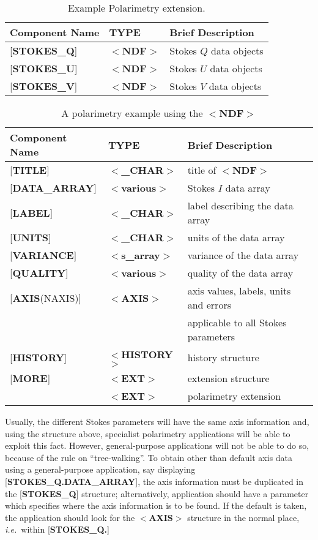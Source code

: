 \begin{table}[htb]
\centering
\caption{Example Polarimetry extension.}
\begin{tabular}{|l|l|l|}
\hline
Component Name & TYPE & Brief Description \\ \hline
{[}{\bf STOKES\_Q}{]} & $<${\bf NDF}$>$ & Stokes $Q$ data objects \\
{[}{\bf STOKES\_U}{]} & $<${\bf NDF}$>$ & Stokes $U$ data objects \\
{[}{\bf STOKES\_V}{]} & $<${\bf NDF}$>$ & Stokes $V$ data objects \\ \hline
\end{tabular}
\end{table}

\begin{table}[htb]
\centering
\caption{A polarimetry example using the $<${\bf NDF}$>$}
\begin{tabular}{|l|l|l|}
\hline
Component Name & TYPE & Brief Description \\ \hline
{[}{\bf TITLE}{]} & $<${\bf \_CHAR}$>$ & title of $<${\bf NDF}$>$ \\
{[}{\bf DATA\_ARRAY}{]} & $<${\bf various}$>$ & Stokes $I$ data array \\
{[}{\bf LABEL}{]} & $<${\bf \_CHAR}$>$ & label describing the data array \\
{[}{\bf UNITS}{]} & $<${\bf \_CHAR}$>$ & units of the data array \\
{[}{\bf VARIANCE}{]} & $<${\bf s\_array}$>$ & variance of the data array \\
{[}{\bf QUALITY}{]} & $<${\bf various}$>$ & quality of the data array \\
{[}{\bf AXIS}(NAXIS){]} & $<${\bf AXIS}$>$ & axis values, labels, units and errors\\
& & applicable to all Stokes parameters \\
{[}{\bf HISTORY}{]} & $<${\bf HISTORY}$>$ & history structure \\
{[}{\bf MORE}{]} & $<${\bf EXT}$>$ & extension structure \\
\hspace{14mm}{[}{\bf .POLARIMETRY}{]} & $<${\bf EXT}$>$ & polarimetry extension \\ \hline
\end{tabular}
\end{table}

Usually, the different Stokes parameters will
have the same axis information and,
using the structure above, specialist polarimetry applications will
be able to exploit this fact.  However, general-purpose applications will
not be able to do so,
because of the rule on ``tree-walking''.  To obtain
other than default
axis data using a general-purpose application, say displaying
{[}{\bf STOKES\_Q.DATA\_ARRAY}{]}, the axis information
must be duplicated in the
{[}{\bf STOKES\_Q}{]} structure; alternatively,
application should have
a parameter which
specifies where the axis information is to be found.
If the default is taken, the application should look
for the $<${\bf AXIS}$>$ structure in
the normal place, {\it i.e.}\  within {[}{\bf STOKES\_Q.}{]} 

